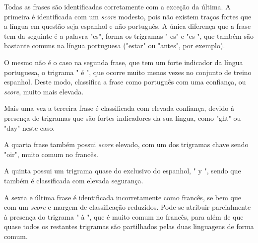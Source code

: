 \documentclass[a4paper,2pt]{report}
\begin{document}
        \par Todas as frases são identificadas corretamente com a exceção da última. A primeira é identificada com um \textit{score} modesto, pois não existem traços fortes que a língua em questão seja espanhol e não português. A única diferença que a frase tem da seguinte é a palavra "es", forma os trigramas " es" e "es ", que também são bastante comuns na língua portuguesa ("estar" ou "antes", por exemplo).
        \par O mesmo não é o caso na segunda frase, que tem um forte indicador da língua portuguesa, o trigrama " é ", que ocorre muito menos vezes no conjunto de treino espanhol. Deste modo, classifica a frase como português com uma confiança, ou \textit{score}, muito mais elevada.
        \par Mais uma vez a terceira frase é classificada com elevada confiança, devido à presença de trigramas que são fortes indicadores da sua língua, como "ght" ou "day" neste caso.
        \par A quarta frase também possui \textit{score} elevado, com um dos trigramas chave sendo "oir", muito comum no francês.
        \par A quinta possui um trigrama quase do exclusivo do espanhol, " y ", sendo que também é classificada com elevada segurança.
        \par A sexta e última frase é identificada incorretamente como francês, se bem que com um \textit{score} e margem de classificação reduzidos. Pode-se atribuir parcialmente à presença do trigrama " à ", que é muito comum no francês, para além de que quase todos os restantes trigramas são partilhados pelas duas linguagens de forma comum.
\end{document}
